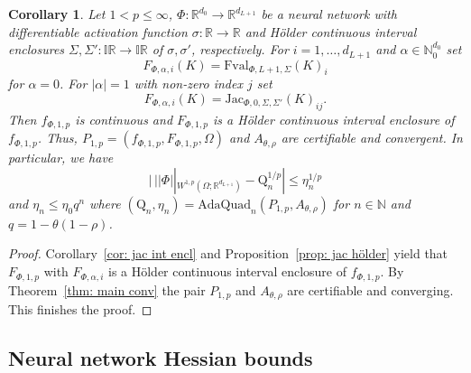 \documentclass[a4paper, 11pt]{article}
\newtheorem{corollary}[theorem]{Corollary}
\begin{document}
	\begin{corollary}\label{corr:mainW1p}
		Let $1<p\leq \infty$, $\Phi : \mathbb{R}^{d_0} \to \mathbb{R}^{d_{L+1}}$ be a neural network with differentiable activation function $\sigma : \mathbb{R} \to \mathbb{R}$ and Hölder continuous interval enclosures $\Sigma,\Sigma':\mathbb{IR}\to \mathbb{IR}$ of $\sigma,\sigma'$, respectively.
		For $i=1, \dotsc, d_{L+1}$ and $\alpha \in\mathbb{N}^{d_0}_0$ set
		$$ F_{\Phi,\alpha,i}(K) = \mathrm{Fval}_{\Phi, L+1, \Sigma}(K)_i$$
		for $\alpha = 0$.
		For $|\alpha|=1$ with non-zero index $j$ set
		$$ F_{\Phi,\alpha,i}(K) = \mathrm{Jac}_{\Phi,0, \Sigma, \Sigma'}(K)_{ij}.$$
		Then $f_{\Phi,1,p}$ is continuous and $F_{\Phi,1,p}$ is a Hölder continuous interval enclosure of $f_{\Phi,1,p}$. Thus, $P_{1,p}=(f_{\Phi, 1,p}, F_{\Phi, 1,p}, \Omega)$ and $A_{\theta,\rho}$ are certifiable and convergent. In particular, we have
		$$ |\, ||\Phi||_{W^{1,p}(\Omega; \mathbb{R}^{d_{L+1}})} - \mathrm{Q}_n^{1/p}| \leq \eta_n^{1/p} $$
		and $\eta_n \leq \eta_0 q^n$ where $(\mathrm{Q}_n, \eta_n) = \mathrm{AdaQuad}_n(P_{1,p}, A_{\theta, \rho})$ for $n\in \mathbb{N}$ and $q=1-\theta(1-\rho)$.
	\end{corollary}
	\begin{proof}
		Corollary~\ref{cor: jac int encl} and Proposition~\ref{prop: jac hölder} yield that $F_{\Phi, 1,p}$ with $F_{\Phi,\alpha,i}$ is a Hölder continuous interval enclosure of $f_{\Phi,1,p}$. By Theorem~\ref{thm: main conv} the pair $P_{1,p}$ and $A_{\theta,\rho}$ are certifiable and converging. This finishes the proof.
	\end{proof}
	
	
	
	\subsection{Neural network Hessian bounds}\label{subsec:hessianBounds}
	
\end{document}
